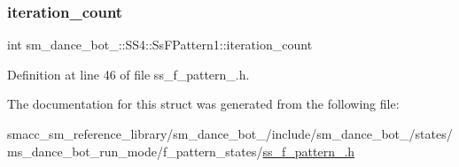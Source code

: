 \subsubsection{\texorpdfstring{iteration\+\_\+count}{iteration\_count}}
{\footnotesize\ttfamily int sm\+\_\+dance\+\_\+bot\+\_\+::\+S\+S4\+::\+Ss\+F\+Pattern1\+::iteration\+\_\+count}



Definition at line 46 of file ss\+\_\+f\+\_\+pattern\+\_.\+h.



The documentation for this struct was generated from the following file\+:\begin{DoxyCompactItemize}
\item 
smacc\+\_\+sm\+\_\+reference\+\_\+library/sm\+\_\+dance\+\_\+bot\+\_/include/sm\+\_\+dance\+\_\+bot\+\_/states/ms\+\_\+dance\+\_\+bot\+\_\+run\+\_\+mode/f\+\_\+pattern\+\_\+states/\hyperlink{sm__dance__bot__2_2include_2sm__dance__bot__2_2states_2ms__dance__bot__run__mode_2f__pattern__states_2ss__f__pattern__1_8h}{ss\+\_\+f\+\_\+pattern\+\_.\+h}\end{DoxyCompactItemize}
